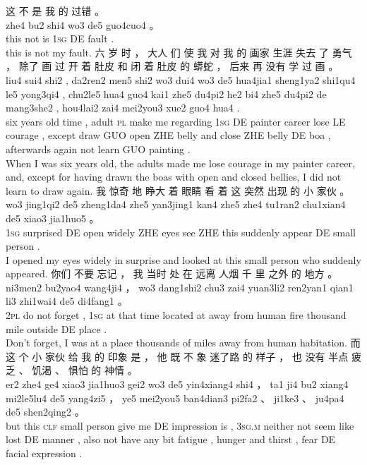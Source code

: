 \documentclass[UTF8]{ctexart}
\begin{document}
\begin{exe}
\ex
\glll
这 不 是 我 的 过错 。
\\
zhe4 bu2 shi4 wo3 de5 guo4cuo4 。
\\
this not is \textsc{1sg} DE fault .
\\
\trans this is not my fault.
\ex
\glll
六 岁 时 ， 大人 们 使 我 对 我 的 画家 生涯 失去 了 勇气 ， 除了 画 过 开 着 肚皮 和 闭 着 肚皮 的 蟒蛇 ， 后来 再 没有 学 过 画 。
\\
liu4 sui4 shi2 , da2ren2 men5 shi2 wo3 dui4 wo3 de5 hua4jia1 sheng1ya2 shi1qu4 le5 yong3qi4 , chu2le5 hua4 guo4 kai1 zhe5 du4pi2 he2 bi4 zhe5 du4pi2 de mang3she2 , hou4lai2 zai4 mei2you3 xue2 guo4 hua4 . 
\\
six {years old} time , adult \textsc{pl} make me regarding \textsc{1sg} DE painter career lose LE courage , except draw GUO open ZHE belly and close ZHE belly DE boa , afterwards again not learn GUO painting .
\\
\trans When I was six years old, the adults made me lose courage in my painter career, and, except for having drawn the boas with open and closed bellies, I did not learn to draw again.
\ex
\glll
我 惊奇 地 睁大 着 眼睛 看 着 这 突然 出现 的 小 家伙 。
\\
wo3 jing1qi2 de5 zheng1da4 zhe5 yan3jing1 kan4 zhe5 zhe4 tu1ran2 chu1xian4 de5 xiao3 jia1huo5 。
\\
\textsc{1sg} surprised DE {open widely} ZHE eyes see ZHE this suddenly appear DE small person .
\\
\trans I opened my eyes widely in surprise and looked at this small person who suddenly appeared. 
\ex
\glll
你们 不要 忘记 ， 我 当时 处 在 远离 人烟 千 里 之外 的 地方 。
\\
ni3men2 bu2yao4 wang4ji4 ， wo3 dang1shi2 chu3 zai4 yuan3li2 ren2yan1 qian1 li3 zhi1wai4 de5 di4fang1 。
\\
\textsc{2pl} {do not} forget , \textsc{1sg} {at that time} {located} at {away from} {human fire} thousand mile {outside} DE place .
\\
\trans Don't forget, I was at a place thousands of miles away from human habitation. 
\ex
\glll
而 这 个 小 家伙 给 我 的 印象 是 ， 他 既 不 象 迷了路 的 样子 ， 也 没有 半点 疲乏 、 饥渴 、 惧怕 的 神情 。
\\
er2 zhe4 ge4 xiao3 jia1huo3 gei2 wo3 de5 yin4xiang4 shi4 ， ta1 ji4 bu2 xiang4 mi2le5lu4 de5 yang4zi5 ， ye5 mei2you5 ban4dian3 pi2fa2 、 ji1ke3 、 ju4pa4 de5 shen2qing2 。
\\
but this \textsc{clf} small person give me DE impression is , \textsc{3sg.m} neither not {seem like} lost DE manner , also {not have} {any bit} fatigue , {hunger and thirst} , fear DE {facial expression} .

\end{exe}
\end{document}
